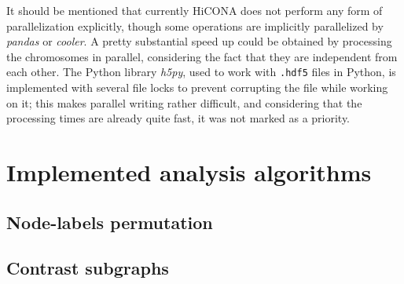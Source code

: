 It should be mentioned that currently HiCONA does not perform any form of parallelization explicitly, though some operations are implicitly parallelized by \textit{pandas} or \textit{cooler}. A pretty substantial speed up could be obtained by processing the chromosomes in parallel, considering the fact that they are independent from each other. The Python library \textit{h5py}, used to work with \texttt{.hdf5} files in Python, is implemented with several file locks to prevent corrupting the file while working on it; this makes parallel writing rather difficult, and considering that the processing times are already quite fast, it was not marked as a priority.

\section{Implemented analysis algorithms}

\subsection{Node-labels permutation}


\subsection{Contrast subgraphs}

